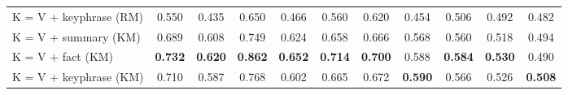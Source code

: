 \begin{table}[t]
{\begin{tabular}{l|cc cc | cc  cc  cc}
K = V + keyphrase (RM) & 0.550 & 0.435 & 0.650 & 0.466 & 0.560 & 0.620 & 0.454 & 0.506 & 0.492 & 0.482 \\
\hdashline
K = V + summary (KM) & 0.689 & 0.608 & 0.749 & 0.624 & 0.658 & 0.666 & 0.568 & 0.560 & 0.518 & 0.494 \\
K = V + fact  (KM) & \textbf{0.732} & \textbf{0.620} & \textbf{0.862} & \textbf{0.652} & \textbf{0.714} & \textbf{0.700} & 0.588 & \textbf{0.584} & \textbf{0.530} & 0.490 \\
K = V + keyphrase  (KM) & 0.710 & 0.587 & 0.768 & 0.602 & 0.665 & 0.672 & \textbf{0.590} & 0.566 & 0.526 & \textbf{0.508} \\
\hline
\end{tabular}
}
\vspace{-3mm}
\label{tab:rank-merging-eval}
\end{table}
